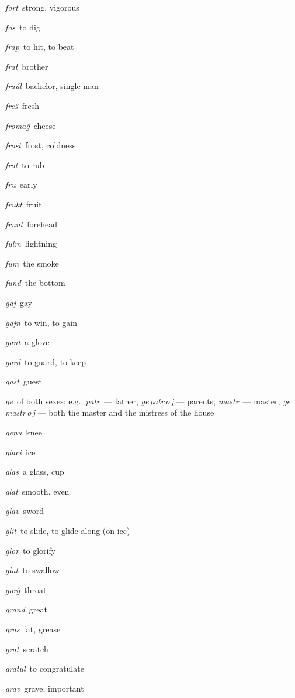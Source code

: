 \begin{landscape}
\begin{multicols}{5}
\begin{outdent}{1em}
\emph{fort\,} strong, vigorous

\emph{fos\,} to dig

\emph{frap\,} to hit, to beat

\emph{frat\,} brother

\emph{fraŭl\,} bachelor, single man

\emph{freŝ\,} fresh

\emph{fromaĝ\,} cheese

\emph{frost\,} frost, coldness

\emph{frot\,} to rub

\emph{fru\,} early

\emph{frukt\,} fruit

\emph{frunt\,} forehead

\emph{fulm\,} lightning

\emph{fum\,} the smoke

\emph{fund\,} the bottom
\end{outdent}


\begin{outdent}{1em}
\emph{gaj\,} gay

\emph{gajn\,} to win, to gain

\emph{gant\,} a glove

\emph{gard\,} to guard, to keep

\emph{gast\,} guest

\emph{ge\,} of both sexes; e.g., \emph{patr\,} — father, \emph{ge\,patr\,o\,j} — parents; \emph{mastr\,} — master, \emph{ge\,mastr\,o\,j} — both the master and the mistress of the house

\emph{genu\,} knee

\emph{glaci\,} ice

\emph{glas\,} a glass, cup

\emph{glat\,} smooth, even

\emph{glav\,} sword

\emph{glit\,} to slide, to glide along (on ice)

\emph{glor\,} to glorify

\emph{glut\,} to swallow

\emph{gorĝ\,} throat

\emph{grand\,} great

\emph{gras\,} fat, grease

\emph{grat\,} scratch

\emph{gratul\,} to congratulate

\emph{grav\,} grave, important


\end{outdent}
\end{multicols}
\end{landscape}
